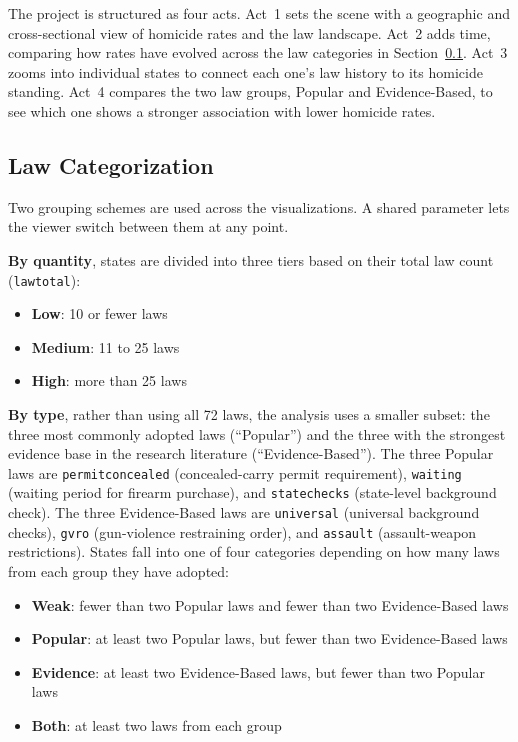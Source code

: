 \documentclass[a4paper,11pt]{article}
\begin{document}
\par
The project is structured as four acts. Act~1 sets the scene with a geographic
and cross-sectional view of homicide rates and the law landscape. Act~2 adds
time, comparing how rates have evolved across the law categories in
Section~\ref{sec:lawcat}. Act~3 zooms into individual states to connect each
one's law history to its homicide standing. Act~4 compares the two law groups,
Popular and Evidence-Based, to see which one shows a stronger association with
lower homicide rates.

\subsection{Law Categorization}\label{sec:lawcat}

\par
Two grouping schemes are used across the visualizations. A shared parameter
lets the viewer switch between them at any point.

\par
\textbf{By quantity}, states are divided into three tiers based on their
total law count (\texttt{lawtotal}):

\begin{itemize}
	\item \textbf{Low}: 10 or fewer laws
	\item \textbf{Medium}: 11 to 25 laws
	\item \textbf{High}: more than 25 laws
\end{itemize}

\par
\textbf{By type}, rather than using all 72 laws, the analysis uses a
smaller subset: the three most commonly adopted laws (``Popular'') and the
three with the strongest evidence base in the research literature
(``Evidence-Based''). The three Popular laws are \texttt{permitconcealed}
(concealed-carry permit requirement), \texttt{waiting} (waiting period for
firearm purchase), and \texttt{statechecks} (state-level background check).
The three Evidence-Based laws are \texttt{universal} (universal background
checks), \texttt{gvro} (gun-violence restraining order), and \texttt{assault}
(assault-weapon restrictions). States fall into one of four categories
depending on how many laws from each group they have adopted:

\begin{itemize}
	\item \textbf{Weak}: fewer than two Popular laws and fewer than two Evidence-Based laws
	\item \textbf{Popular}: at least two Popular laws, but fewer than two Evidence-Based laws
	\item \textbf{Evidence}: at least two Evidence-Based laws, but fewer than two Popular laws
	\item \textbf{Both}: at least two laws from each group
\end{itemize}
\end{document}
